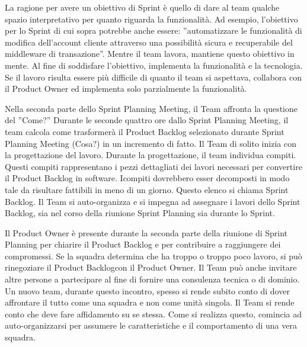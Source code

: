La ragione per avere un obiettivo di Sprint \`e quello di dare al team qualche spazio interpretativo per quanto
riguarda la funzionalit\`a. Ad esempio, l'obiettivo per lo Sprint di cui sopra potrebbe anche essere: ''automatizzare
le funzionalit\`a di modifica dell'account cliente attraverso una possibilit\`a sicura e recuperabile del middleware di
transazione''. Mentre il team lavora, mantiene questo obiettivo in mente. Al fine di soddisfare l'obiettivo, implementa
la funzionalit\`a e la tecnologia. Se il lavoro risulta essere pi\`u difficile di quanto il team si aspettava,
collabora con il Product Owner ed implementa solo parzialmente la funzionalit\`a. 
\newline

Nella seconda parte dello Sprint Planning Meeting, il Team affronta la questione del ''Come?'' Durante le seconde
quattro ore dallo Sprint Planning Meeting, il team calcola come trasformer\`a il Product Backlog selezionato durante
Sprint Planning Meeting (Cosa?) in un incremento di fatto. Il Team di solito inizia con la progettazione del lavoro.
Durante la progettazione, il team individua compiti. Questi compiti rappresentano i pezzi dettagliati dei lavori
necessari per convertire il Product Backlog in software. Icompiti dovrebbero esser decomposti in modo tale da risultare
fattibili in meno di un giorno. Questo elenco si chiama Sprint Backlog. Il Team si auto-organizza e si impegna ad
assegnare i lavori dello Sprint Backlog, sia nel corso della riunione Sprint Planning sia durante lo Sprint. 
\newline

Il Product Owner \`e presente durante la seconda parte della riunione di Sprint Planning per chiarire il Product
Backlog e per contribuire a raggiungere dei compromessi. Se la squadra determina che ha troppo o troppo poco lavoro, si
pu\`o rinegoziare il Product Backlogcon il Product Owner. Il Team pu\`o anche invitare altre persone a partecipare al
fine di fornire una consulenza tecnica o di dominio. Un nuovo team, durante questo incontro, spesso si rende subito
conto di dover affrontare il tutto come una squadra e non come unit\`a singola. Il Team si rende conto che deve fare
affidamento su se stessa. Come si realizza questo, comincia ad auto-organizzarsi per assumere le caratteristiche e il
comportamento di una vera squadra.


